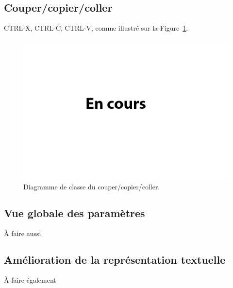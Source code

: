     \subsection{Couper/copier/coller}
		CTRL-X, CTRL-C, CTRL-V, comme illustré sur la {\sc Figure}~{\ref{fig:copiercoller}}.
    	
    	\begin{figure}[H]
	        \centering
	        \includegraphics[height=0.3\textwidth]{figure/copiercoller.png}
	        \caption{Diagramme de classe du couper/copier/coller.}
	        \label{fig:copiercoller}
	    \end{figure}
	    
	\subsection{Vue globale des paramètres}
		À faire aussi
	
	\subsection{Amélioration de la représentation textuelle}
		À faire également
	  